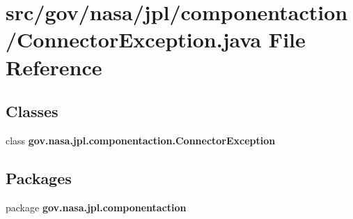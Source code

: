 \section{src/gov/nasa/jpl/componentaction/\+Connector\+Exception.java File Reference}
\label{_connector_exception_8java}
\subsection*{Classes}
\begin{DoxyCompactItemize}
\item 
class {\bf gov.\+nasa.\+jpl.\+componentaction.\+Connector\+Exception}
\end{DoxyCompactItemize}
\subsection*{Packages}
\begin{DoxyCompactItemize}
\item 
package {\bf gov.\+nasa.\+jpl.\+componentaction}
\end{DoxyCompactItemize}
